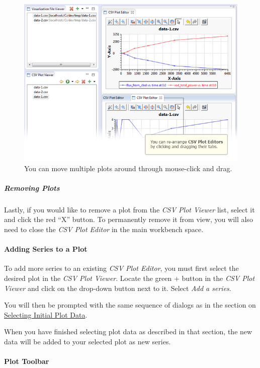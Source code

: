 \begin{figure}[htbp]
\centering
\includegraphics[width=\textwidth]{figures/ICE_CSVPlotEditor-Moved.png}
\caption{You can move multiple plots around through mouse-click and drag.}
\end{figure}

\subparagraph{Removing Plots}\label{removing-plots}

Lastly, if you would like to remove a plot from the \emph{CSV Plot
Viewer} list, select it and click the red ``X'' button. To permanently
remove it from view, you will also need to close the \emph{CSV Plot
Editor} in the main workbench space.

\paragraph{Adding Series to a Plot}\label{adding-series-to-a-plot}

To add more series to an existing \emph{CSV Plot Editor}, you must first
select the desired plot in the \emph{CSV Plot Viewer}. Locate the green
+ button in the \emph{CSV Plot Viewer} and click on the drop-down
button next to it. Select \emph{Add a series}.

You will then be prompted with the same sequence of dialogs as in the
section on \hyperref[Selectingux5fInitialux5fPlotux5fData]{Selecting
Initial Plot Data}.

When you have finished selecting plot data as described in that section,
the new data will be added to your selected plot as new series.

\paragraph{Plot Toolbar}\label{plot-toolbar}

